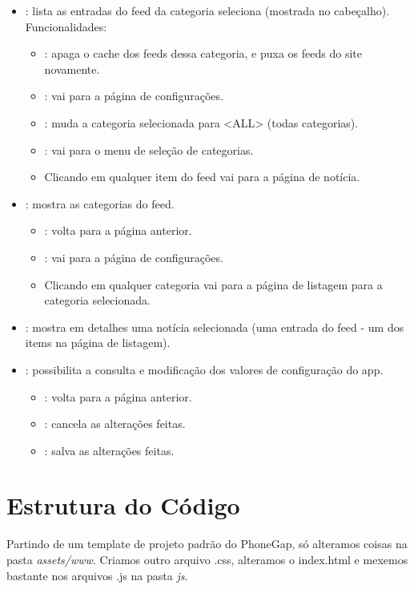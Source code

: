 \begin{itemize}
    \item {}: lista as entradas do feed da categoria seleciona (mostrada no cabeçalho). Funcionalidades:
        \begin{itemize}
            \item {}: apaga o cache dos feeds dessa categoria, e puxa os feeds do site novamente.
            \item {}: vai para a página de configurações.
            \item {}: muda a categoria selecionada para <ALL> (todas categorias).
            \item {}: vai para o menu de seleção de categorias.
            \item Clicando em qualquer item do feed vai para a página de notícia.
        \end{itemize}
    \item {}: mostra as categorias do feed.
        \begin{itemize}
            \item {}: volta para a página anterior.
            \item {}: vai para a página de configurações.
            \item Clicando em qualquer categoria vai para a página de listagem para a categoria selecionada.
        \end{itemize}
    \item {}: mostra em detalhes uma notícia selecionada (uma entrada do feed - um dos items na página de listagem).
    \item {}: possibilita a consulta e modificação dos valores de configuração do app.
        \begin{itemize}
            \item {}: volta para a página anterior.
            \item {}: cancela as alterações feitas.
            \item {}: salva as alterações feitas.
        \end{itemize}
\end{itemize}

\section{Estrutura do Código}
Partindo de um template de projeto padrão do PhoneGap, só alteramos coisas na pasta 
\textit{assets/www}. Criamos outro arquivo .css, alteramos o index.html e mexemos bastante
nos arquivos .js na pasta \textit{js}.

